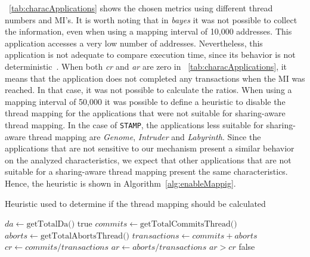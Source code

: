 \tablename~\ref{tab:characApplications} shows the chosen metrics using different thread numbers and MI's. It is worth noting that in \emph{bayes} it was not possible to collect the information, even when using a mapping interval of 10,000 addresses. This application accesses a very low number of addresses. Nevertheless, this application is not adequate to compare execution time, since its behavior is not deterministic~\cite{Ruan:2014}. When both \textit{cr} and \textit{ar} are zero in \tablename~\ref{tab:characApplications}, it means that the application does not completed any transactions when the MI was reached. In that case, it was not possible to calculate the ratios. When using a mapping interval of 50,000 it was possible to define a heuristic to disable the thread mapping for the applications that were not suitable for sharing-aware thread mapping. In the case of  \texttt{STAMP}, the applications less suitable for sharing-aware thread mapping are \emph{Genome}, \emph{Intruder} and \emph{Labyrinth}. Since the applications that are not sensitive to our mechanism present a similar behavior on the analyzed characteristics, we expect that other applications that are not suitable for a sharing-aware thread mapping present the same characteristics. Hence, the heuristic is shown in Algorithm~\ref{alg:enableMappig}.

\begin{algorithm}[!tb]
	\caption{Heuristic used to determine if the thread mapping should be calculated}\label{alg:enableMappig}
	\small
	\begin{algorithmic}[1]
		\State $da \gets \text{getTotalDa()}$ \label{alg:emCountDa}
		\State \Return true   
		\Else
		\State $commits \gets \text{getTotalCommitsThread()}$ \label{alg:emCommits} 
		\State $aborts \gets \text{getTotalAbortsThread()}$ 
		\State $transactions \gets commits + aborts$
		\State $cr \gets commits / transactions$
		\State $ar \gets aborts / transactions$
		\State \Return $ar > cr$ \label{alg:emARGeCR}
		\Else
		\State \Return false  \label{alg:emReturnFalse} 				
		\EndIf
		\EndIf
		\EndFunction
	\end{algorithmic}
\end{algorithm}

